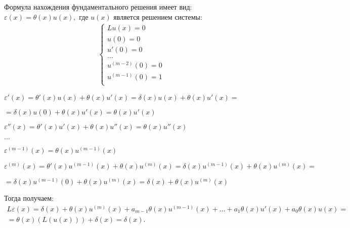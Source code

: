 \begin{theorem}\label{lec:13/the:2}
	Формула нахождения фундаментального решения имеет вид: $ \varepsilon(x) = \theta(x)u(x), $ где $ u(x) $ является решением системы: 
	$$\begin{gathered}
		\begin{cases}
			Lu(x) = 0\\
			u(0) = 0\\
			u'(0) = 0 \\
			\ldots\\
			u^{(m-2)}(0) = 0\\
			u^{(m-1)}(0) = 1\\
		\end{cases}
	\end{gathered}$$
\end{theorem}
\begin{Proof}
	\begin{flushleft}
		$\varepsilon'(x) = \theta'(x)u(x) + \theta(x)u'(x) = \delta(x)u(x) + \theta(x)u'(x) =$
		
		\hspace{1.15cm}$= \delta(x)u(0) + \theta(x)u'(x) = \theta(x)u'(x)$

		$\varepsilon''(x) = \theta'(x)u'(x) + \theta(x)u''(x) = \theta(x)u''(x)$

		$\dots$
		
		$\varepsilon^{(m - 1)}(x) = \theta(x)u^{(m - 1)}(x)$

		$\varepsilon^{(m)}(x) = \theta'(x)u^{(m - 1)}(x) + \theta(x)u^{(m)}(x) = \delta(x)u^{(m - 1)}(x) + \theta(x)u^{(m)}(x) =$

		\hspace{1.5cm} $= \delta(x)u^{(m - 1)}(0) + \theta(x)u^{(m)}(x) = \delta(x) + \theta(x)u^{(m)}(x)$
	\end{flushleft}
	Тогда получаем:
	$$\begin{gathered}
		L\varepsilon(x) = \delta(x) + \theta(x)u^{(m)}(x) + a_{m - 1}\theta(x)u^{(m - 1)}(x) + \ldots + a_1\theta(x)u'(x) + a_0\theta(x)u(x) = \\
		= \theta(x)(L(u(x))) + \delta(x) = \delta(x).
	\end{gathered}$$
\end{Proof}











